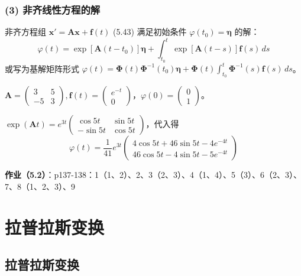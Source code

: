 \subsubsection{(3) 非齐线性方程的解}

非齐方程组 $\mathbf{x}' = \mathbf{A}\mathbf{x} + \mathbf{f}(t)$ (5.43) 满足初始条件 $\varphi(t_0) = \boldsymbol{\eta}$ 的解：
$$\varphi(t) = \exp[\mathbf{A}(t-t_0)]\boldsymbol{\eta} + \int_{t_0}^{t}\exp[\mathbf{A}(t-s)]\mathbf{f}(s)\,ds$$
或写为基解矩阵形式 $\varphi(t) = \boldsymbol{\Phi}(t)\boldsymbol{\Phi}^{-1}(t_0)\boldsymbol{\eta} + \boldsymbol{\Phi}(t)\int_{t_0}^{t}\boldsymbol{\Phi}^{-1}(s)\mathbf{f}(s)\,ds$。

\begin{example}
$\mathbf{A} = \begin{pmatrix} 3 & 5 \\ -5 & 3 \end{pmatrix}, \mathbf{f}(t) = \begin{pmatrix} e^{-t} \\ 0 \end{pmatrix}$，$\varphi(0) = \begin{pmatrix}0\\1\end{pmatrix}$。
\end{example}

\begin{solution}
$\exp(\mathbf{A}t) = e^{3t}\begin{pmatrix}\cos 5t & \sin 5t \\ -\sin 5t & \cos 5t\end{pmatrix}$，代入得
$$\varphi(t) = \frac{1}{41}e^{3t}\begin{pmatrix} 4\cos 5t + 46\sin 5t - 4e^{-4t} \\ 46\cos 5t - 4\sin 5t - 5e^{-4t} \end{pmatrix}$$
\end{solution}

\textbf{作业（5.2）}：p137-138：1（1、2）、2、3（2、3）、4（1、4）、5（3）、6（2、3）、7、8（1、2、3）、9

\section{拉普拉斯变换}

\subsection{拉普拉斯变换}

